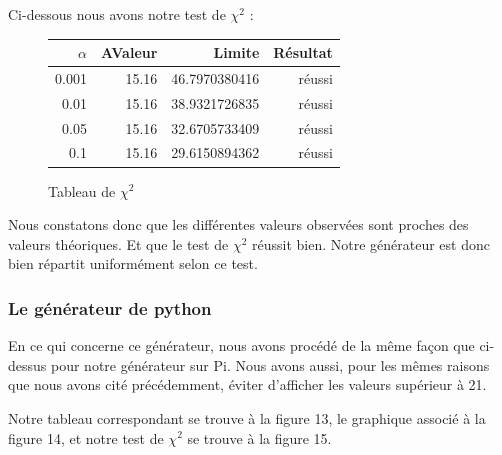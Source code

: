 \documentclass[10pt,a4paper]{article}
\begin{document}
Ci-dessous nous avons notre test de $\chi^2$ :

\begin{figure}[h]
\centering
\begin{tabular}{|r|r|r|r|}
\hline
$\alpha$ & AValeur & Limite & Résultat\\
\hline
0.001 & 15.16 & 46.7970380416 & réussi\\
0.01 & 15.16 & 38.9321726835 & réussi\\
0.05 & 15.16 & 32.6705733409 & réussi\\
0.1 & 15.16 & 29.6150894362 & réussi\\
\hline
\end{tabular}
\caption{Tableau de $\chi^2$}
\end{figure}


Nous constatons donc que les différentes valeurs observées sont proches des valeurs théoriques. Et que le test de $\chi^2$ réussit bien. Notre générateur est donc bien répartit uniformément selon ce test.

\newpage

	\subsubsection{Le générateur de python}
En ce qui concerne ce générateur, nous avons procédé de la même façon que ci-dessus pour notre générateur sur Pi. Nous avons aussi, pour les mêmes raisons que nous avons cité précédemment, éviter d'afficher les valeurs supérieur à 21.

Notre tableau correspondant se trouve à la figure 13, le graphique associé à la figure 14, et notre test de $\chi^2$ se trouve à la figure 15.
	
\end{document}

